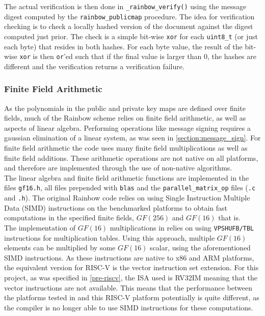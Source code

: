 The actual verification is then done in \texttt{\_rainbow\_verify()} using the message digest computed by the \texttt{rainbow\_publicmap} procedure. The idea for verification checking is to check a locally hashed version of the document against the digest computed just prior. The check is a simple bit-wise \texttt{xor} for each \texttt{uint8\_t} (or just each byte) that resides in both hashes. For each byte value, the result of the bit-wise \texttt{xor} is then \texttt{or}'ed such that if the final value is larger than 0, the hashes are different and the verification returns a verification failure.

\subsubsection{Finite Field Arithmetic} \label{implementation:ffa}
As the polynomials in the public and private key maps are defined over finite fields, much of the Rainbow scheme relies on finite field arithmetic, as well as aspects of linear algebra. Performing operations like message signing requires a gaussian elimination of a linear system, as was seen in \cref{section:message_sign}. For finite field arithmetic the code uses many finite field multiplications as well as finite field additions. These arithmetic operations are not native on all platforms, and therefore are implemented through the use of non-native algorithms.\medskip\\
The linear algebra and finite field arithmetic functions are implemented in the files \texttt{gf16.h}, all files prepended with \texttt{blas} and the \texttt{parallel\_matrix\_op} files (\texttt{.c} and \texttt{.h}). The original Rainbow code relies on using Single Instruction Multiple Data (SIMD) instructions on the benchmarked platforms to obtain fast computations in the specified finite fields, $GF(256)$ and $GF(16)$ that is.
\medskip\\
The implementation of $GF(16)$ multiplications in \cite{rainbownist} relies on using \texttt{VPSHUFB/TBL} instructions for multiplication tables. Using this approach, multiple $GF(16)$ elements can be multiplied by some $GF(16)$ scalar, using the aforementioned SIMD instructions. As these instructions are native to x86 and ARM platforms, the equivalent version for RISC-V is the vector instruction set extension. For this project, as was specified in \cref{pre-riscv}, the ISA used is RV32IM meaning that the vector instructions are not available. This means that the performance between the platforms tested in \cite{rainbownist} and this RISC-V platform potentially is quite different, as the compiler is no longer able to use SIMD instructions for these computations.
